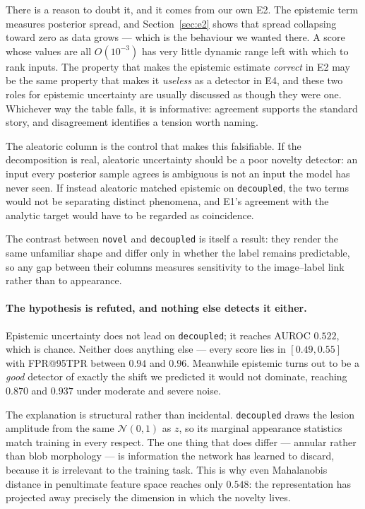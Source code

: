 \documentclass{article}
\begin{document}
There is a reason to doubt it, and it comes from our own E2. The epistemic term
measures posterior spread, and Section~\ref{sec:e2} shows that spread collapsing
toward zero as data grows --- which is the behaviour we wanted there. A score
whose values are all $O(10^{-3})$ has very little dynamic range left with which to
rank inputs. The property that makes the epistemic estimate \emph{correct} in E2
may be the same property that makes it \emph{useless} as a detector in E4, and
these two roles for epistemic uncertainty are usually discussed as though they
were one. Whichever way the table falls, it is informative: agreement supports the
standard story, and disagreement identifies a tension worth naming.

The aleatoric column is the control that makes this falsifiable. If the
decomposition is real, aleatoric uncertainty should be a poor novelty detector:
an input every posterior sample agrees is ambiguous is not an input the model has
never seen. If instead aleatoric matched epistemic on \texttt{decoupled}, the two
terms would not be separating distinct phenomena, and E1's agreement with the
analytic target would have to be regarded as coincidence.

The contrast between \texttt{novel} and \texttt{decoupled} is itself a result:
they render the same unfamiliar shape and differ only in whether the label
remains predictable, so any gap between their columns measures sensitivity to the
image--label link rather than to appearance.

\paragraph{The hypothesis is refuted, and nothing else detects it either.}
Epistemic uncertainty does not lead on \texttt{decoupled}; it reaches AUROC
$0.522$, which is chance. Neither does anything else --- every score lies in
$[0.49, 0.55]$ with FPR@95TPR between $0.94$ and $0.96$. Meanwhile epistemic
turns out to be a \emph{good} detector of exactly the shift we predicted it would
not dominate, reaching $0.870$ and $0.937$ under moderate and severe noise.

The explanation is structural rather than incidental. \texttt{decoupled} draws
the lesion amplitude from the same $\mathcal{N}(0,1)$ as $z$, so its marginal
appearance statistics match training in every respect. The one thing that does
differ --- annular rather than blob morphology --- is information the network has
learned to discard, because it is irrelevant to the training task. This is why
even Mahalanobis distance in penultimate feature space reaches only $0.548$: the
representation has projected away precisely the dimension in which the novelty
lives.
\end{document}
